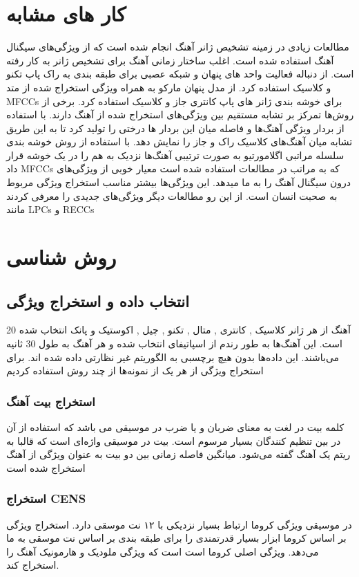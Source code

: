 \documentclass[conference]{IEEEtran}
\begin{document}
\section{کار های مشابه}
مطالعات زیادی در زمینه تشخیص ژانر آهنگ انجام شده است که از ویژگی‌های سیگنال آهنگ استفاده شده است. اغلب ساختار زمانی آهنگ    برای تشخیص ژانر به کار رفته است. از دنباله فعالیت واحد های پنهان و شبکه عصبی برای طبقه بندی به راک پاپ تکنو و کلاسیک استفاده کرد. از مدل پنهان مارکو      به همراه ویژگی استخراج شده از متد MFCCs      برای خوشه بندی ژانر های پاپ کانتری جاز و کلاسیک استفاده کرد.
برخی از روش‌ها تمرکز بر تشابه مستقیم بین ویژگی‌های استخراج شده از آهنگ دارند.
با استفاده از بردار ویژگی آهنگ‌ها و فاصله میان این بردار ها درختی را تولید کرد تا به این طریق تشابه میان آهنگ‌های کلاسیک راک و جاز را نمایش دهد. با استفاده از روش خوشه بندی سلسله مراتبی اگلامورتیو به صورت ترتیبی آهنگ‌ها نزدیک به هم را در یک خوشه قرار داد 
MFCCs که به مراتب در مطالعات استفاده شده است معیار خوبی از ویژگی‌های درون سیگنال آهنگ را به ما میدهد. این ویژگی‌ها بیشتر مناسب استخراج ویژگی مربوط به صحبت انسان است. از این رو مطالعات دیگر ویژگی‌های جدیدی را معرفی کردند مانند LPCs       و   RECCs  

\section{ روش شناسی}
\subsection{ انتخاب داده و استخراج ویژگی }
20 آهنگ از هر ژانر کلاسیک    , کانتری   , متال    , تکنو    , چیل    , اکوستیک     و پانک      انتخاب شده است. این آهنگ‌ها به طور رندم از اسپاتیفای انتخاب شده و هر آهنگ به طول 30 ثانیه می‌باشند. این داده‌ها بدون هیچ برچسبی به الگوریتم غیر نظارتی داده شده اند.
 برای استخراج ویژگی از هر یک از نمونه‌ها از چند روش استفاده کردیم
\subsubsection{استخراج بیت     آهنگ}
کلمه بیت در لغت به معنای ضربان و یا ضرب در موسیقی می باشد که استفاده از آن در بین تنظیم کنندگان بسیار مرسوم است. بیت در موسیقی واژه‌ای است که قالبا به ریتم یک آهنگ گفته می‌شود. میانگین فاصله زمانی بین دو بیت به عنوان ویژگی از آهنگ استخراج شده است
\subsubsection{ استخراج CENS      }
در موسیقی ویژگی کروما ارتباط بسیار نزدیکی با ۱۲ نت موسقی دارد. استخراج ویژگی بر اساس کروما ابزار بسیار قدرتمندی را برای طبقه بندی بر اساس نت موسقی به ما می‌دهد. ویژگی اصلی کروما است است که ویژگی ملودیک و هارمونیک آهنگ را استخراج کند.
\end{document}
